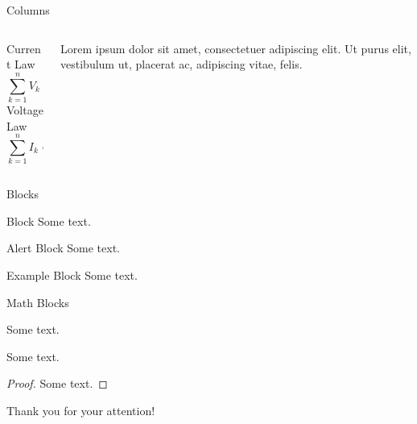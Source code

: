 \documentclass[beamer]{uibk}
\begin{document}
\begin{frame}{Columns}
    \begin{columns}[c]
        \begin{column}{.49\textwidth}
            Current Law \[\sum^n_{k=1} V_k = 0\]
            Voltage Law \[\sum^n_{k=1} I_k = 0\]
        \end{column}
        \begin{column}{.49\textwidth}
            Lorem ipsum dolor sit amet, consectetuer adipiscing elit. Ut purus
            elit, vestibulum ut, placerat ac, adipiscing vitae, felis.
        \end{column}
    \end{columns}
\end{frame}

\begin{frame}{Blocks}
    \begin{block}{Block}
        Some text.
    \end{block}

    \begin{alertblock}{Alert Block}
        Some text.
    \end{alertblock}

    \begin{exampleblock}{Example Block}
        Some text.
    \end{exampleblock}
\end{frame}

\begin{frame}{Math Blocks}
    \begin{definition}
        Some text.
    \end{definition}

    \begin{theorem}
        Some text.
    \end{theorem}

    \begin{proof}
        Some text.
    \end{proof}
\end{frame}

\begin{frame}
    \begin{center}
        \huge{Thank you for your attention!}
    \end{center}
\end{frame}
\end{document}
